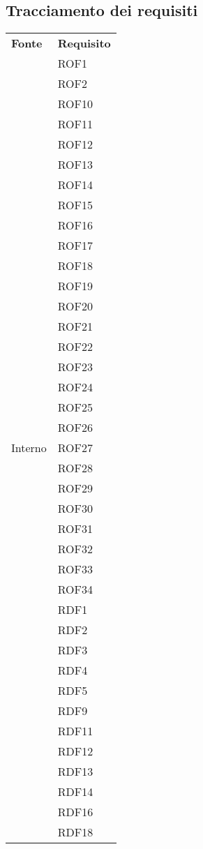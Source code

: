 \subsection{Tracciamento dei requisiti}
\begin{longtable}{| p{5cm} | p{5cm} |}
		\rowcolor{LightBlue}
		\color{white}\bfseries Fonte & \color{white}\bfseries Requisito \\[0.25cm]
\multirow[t]{61}{*}{Interno}		
				 & 	ROF1 \\
				&	ROF2 \\
				&	ROF10 \\
				&	ROF11 \\
				&	ROF12 \\
				&	ROF13 \\
				&	ROF14 \\
				&	ROF15 \\
				&	ROF16 \\
				&	ROF17 \\
				&	ROF18 \\
				&	ROF19 \\
				&	ROF20 \\
				&	ROF21 \\
				&	ROF22 \\
				& 	ROF23 \\
				& 	ROF24 \\
				& 	ROF25 \\
				& 	ROF26 \\
				& 	ROF27 \\
				& 	ROF28 \\
				& 	ROF29 \\
				& 	ROF30 \\
				& 	ROF31 \\
				& 	ROF32 \\
				& 	ROF33 \\
				& 	ROF34 \\
				&	RDF1 \\
				&	RDF2 \\
				&	RDF3 \\
				&	RDF4 \\
				&	RDF5 \\
				&	RDF9 \\
				&	RDF11 \\
				&	RDF12 \\
				&	RDF13 \\
				&	RDF14 \\
				&	RDF16 \\
				&	RDF18 \\

\end{longtable}
